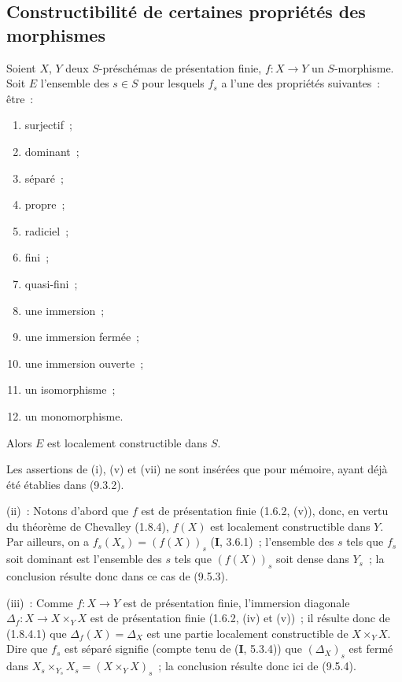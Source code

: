 \subsection{Constructibilité de certaines propriétés des morphismes}
\label{subsection:IV.9.6-fr}

\begin{proposition}[9.6.1]
\label{IV.9.6.1-fr}
Soient $X$, $Y$ deux $S$-préschémas de présentation finie, $f:X\to Y$ un
$S$-morphisme. Soit $E$ l'ensemble des $s\in S$ pour lesquels $f_s$ a l'une
des propriétés suivantes~: être~:
\begin{enumerate}[label=(\roman*),widest=xii]
  \item surjectif~;
  \item dominant~;
  \item séparé~;
  \item propre~;
  \item radiciel~;
  \item fini~;
  \item quasi-fini~;
  \item une immersion~;
  \item une immersion fermée~;
  \item une immersion ouverte~;
  \item un isomorphisme~;
  \item un monomorphisme.
\end{enumerate}
Alors $E$ est localement constructible dans $S$.
\end{proposition}

Les assertions de (i), (v) et (vii) ne sont insérées que pour mémoire, ayant
déjà été établies dans (9.3.2).

(ii)~: Notons d'abord que $f$ est de présentation finie (1.6.2, (v)), donc, en
vertu du théorème de Chevalley (1.8.4), $f(X)$ est localement constructible dans
$Y$. Par ailleurs, on a $f_s(X_s)=(f(X))_s$ (\textbf{I}, 3.6.1)~; l'ensemble
des $s$ tels que $f_s$ soit dominant est l'ensemble des $s$ tels que
$(f(X))_s$ soit dense dans $Y_s$~; la conclusion résulte donc dans ce cas de
(9.5.3).

(iii)~: Comme $f:X\to Y$ est de présentation finie, l'immersion diagonale
$\Delta_f:X\to X\times_YX$ est de présentation finie (1.6.2, (iv) et (v))~; il
résulte donc de (1.8.4.1) que $\Delta_f(X)=\Delta_X$ est une partie localement
constructible de $X\times_YX$. Dire que $f_s$ est séparé signifie (compte tenu
de (\textbf{I}, 5.3.4)) que $(\Delta_X)_s$ est fermé dans
$X_s\times_{Y_s}X_s=(X\times_YX)_s$~; la conclusion résulte donc ici de
(9.5.4).


